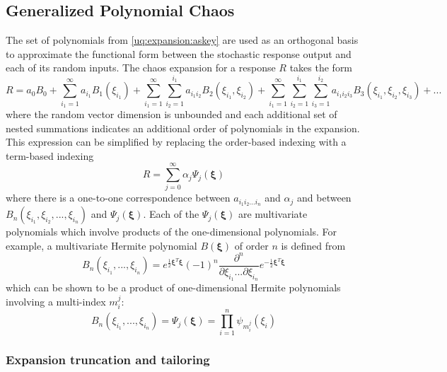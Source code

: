 \subsection{Generalized Polynomial Chaos} \label{uq:expansion:pce}

The set of polynomials from \ref{uq:expansion:askey} are
used as an orthogonal basis to approximate the functional form between
the stochastic response output and each of its random inputs.  The
chaos expansion for a response $R$ takes the form
\begin{equation}
R = a_0 B_0 + \sum_{i_1=1}^{\infty} a_{i_1} B_1(\xi_{i_1}) + 
\sum_{i_1=1}^{\infty} \sum_{i_2=1}^{i_1} a_{i_1i_2} B_2(\xi_{i_1},\xi_{i_2}) +
\sum_{i_1=1}^{\infty} \sum_{i_2=1}^{i_1} \sum_{i_3=1}^{i_2} a_{i_1i_2i_3}
B_3(\xi_{i_1},\xi_{i_2},\xi_{i_3}) + ...\label{eq:expansion_long}
\end{equation}
where the random vector dimension is unbounded and each additional set
of nested summations indicates an additional order of polynomials in
the expansion.  This expression can be simplified by replacing the
order-based indexing with a term-based indexing
\begin{equation}
R = \sum_{j=0}^{\infty} \alpha_j \Psi_j(\boldsymbol{\xi})
\label{eq:expansion_short}
\end{equation}
where there is a one-to-one correspondence between $a_{i_1i_2...i_n}$
and $\alpha_j$ and between
$B_n(\xi_{i_1},\xi_{i_2},...,\xi_{i_n})$ and
$\Psi_j(\boldsymbol{\xi})$.  Each of the
$\Psi_j(\boldsymbol{\xi})$ are multivariate polynomials
which involve products of the one-dimensional polynomials.  For
example, a multivariate Hermite polynomial
$B(\boldsymbol{\xi})$ of order $n$ is defined from
\begin{equation}
B_n(\xi_{i_1}, ..., \xi_{i_n}) = 
e^{\frac{1}{2}\boldsymbol{\xi}^T\boldsymbol{\xi}} (-1)^n 
\frac{\partial^n}{\partial \xi_{i_1} ... \partial \xi_{i_n}} 
e^{-\frac{1}{2}\boldsymbol{\xi}^T\boldsymbol{\xi}} \label{eq:multivar_gen}
\end{equation}
which can be shown to be a product of one-dimensional Hermite polynomials
involving a multi-index $m_i^j$:
\begin{equation}
B_n(\xi_{i_1}, ..., \xi_{i_n}) = 
\Psi_j(\boldsymbol{\xi}) = 
\prod_{i=1}^{n} \psi_{m_i^j}(\xi_i) \label{eq:multivar_prod}
\end{equation}

\subsubsection{Expansion truncation and tailoring} \label{uq:expansion:pce:exp_tnt}

